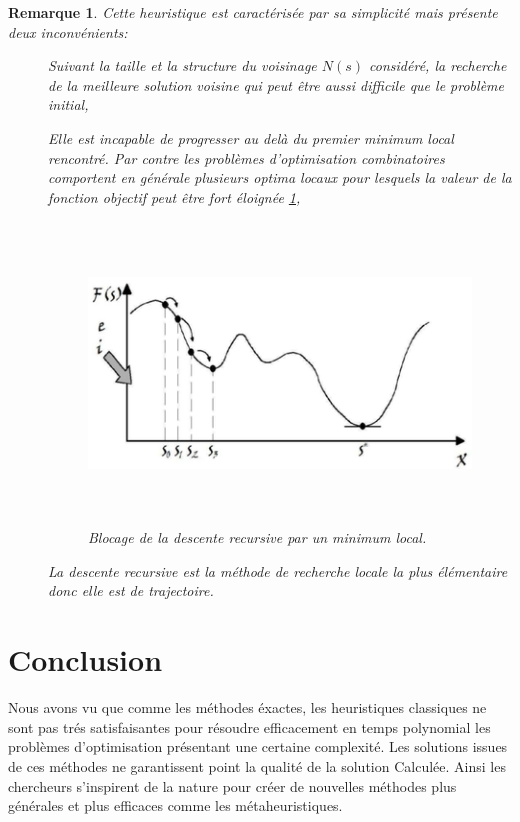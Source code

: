 \documentclass[a4paper,11pt,oneside]{report}
\newtheorem{remarque}{Remarque}[section]
\theoremstyle{plain}
\newcommand{\0}{/ \! \! \! 0}
\theoremstyle{plain}
\begin{document}
\begin{remarque}
Cette heuristique est caract\'eris\'ee par sa simplicit\'e mais pr\'esente deux inconv\'enients:
\begin{description}
 \item[] Suivant la taille et la structure du voisinage $N(s)$ consid\'er\'e, la recherche de la meilleure solution voisine qui peut \^etre 
 aussi difficile que le probl\`eme initial,
 \item[] Elle est incapable de progresser au del\`a du premier minimum local rencontr\'e. Par contre les probl\`emes d'optimisation 
 combinatoires comportent en g\'en\'erale plusieurs optima locaux pour lesquels la valeur de la fonction objectif peut \^etre fort \'eloign\'ee 
 \ref{descent},
  \begin{figure}[htbp]
  \begin{center}
  \includegraphics[height=8cm,width=15cm]{descent.png}
  \caption{\label{descent} Blocage de la descente recursive par un minimum local.}
  \end{center}
  \end{figure}
 \item [] La descente recursive est la m\'ethode de recherche locale la plus \'el\'ementaire donc elle est de trajectoire.
\end{description}
\end{remarque}
\newpage
\section{Conclusion}
Nous avons vu que comme les m\'ethodes \'exactes, les heuristiques classiques ne sont pas tr\'es satisfaisantes pour r\'esoudre efficacement en temps polynomial
 les probl\`emes d'optimisation pr\'esentant une certaine complexit\'e. Les solutions issues de ces m\'ethodes ne garantissent point la qualit\'e de la
  solution Calcul\'ee. Ainsi les chercheurs s'inspirent de la nature pour cr\'eer de nouvelles m\'ethodes plus g\'en\'erales et plus efficaces comme 
  les m\'etaheuristiques.
\end{document}
